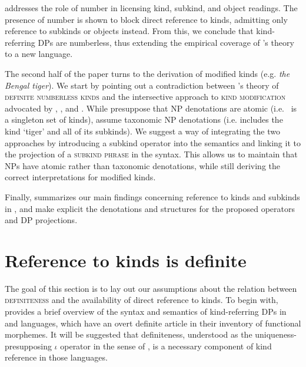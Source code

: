 \documentclass[output=paper]{langscibook}
\begin{document}
 addresses the role of number in licensing kind, subkind, and object readings. The presence of number is shown to block direct reference to kinds, admitting only reference to subkinds or objects instead. From this, we conclude that  kind-referring DPs are numberless, thus extending the empirical coverage of \citeauthor{Borik.Espinal2012}'s theory to a new language.

The second half of the paper turns to the derivation of modified kinds (e.g. \textit{the Bengal tiger}). We start   by pointing out a contradiction between \citeauthor{Borik.Espinal2012}'s theory of \textsc{definite numberless kinds} and the intersective approach to \textsc{kind modification} advocated by \citet{McNally.Boleda2004}, \citet{Wagiel2014}, and \citet{Borik.Espinal2015}. While \citeauthor{Borik.Espinal2012} presuppose that NP denotations are atomic (i.e.\  is a singleton set of kinds), \citet{McNally.Boleda2004} assume taxonomic NP denotations (i.e.  includes the kind `tiger' and all of its subkinds). We suggest a way of integrating the two approaches by introducing a subkind operator  into the semantics and linking it to the projection of a \textsc{subkind phrase} in the syntax. This allows us to maintain that NPs have atomic rather than taxonomic denotations, while still deriving the correct interpretations for modified kinds.

Finally,  summarizes our main findings concerning reference to kinds and subkinds in , and make explicit the denotations and structures for the proposed operators and DP projections.


\section{Reference to kinds is definite}\label{sec:2-nominals-def}

The goal of this section is to lay out our assumptions about the relation between \textsc{definiteness} and the availability of direct reference to kinds. To begin with,  provides a brief overview of the syntax and semantics of kind-referring DPs in  and  languages, which have an overt definite article in their inventory of functional morphemes. It will be suggested that definiteness, understood as the uniqueness-presupposing $\iota$ operator in the sense of \citet{Partee1987}, is a necessary component of kind reference in those languages.
\end{document}
